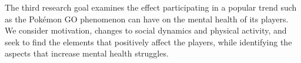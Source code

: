 The third research goal examines the effect participating in a popular trend such as the Pokémon GO phenomenon can have on the mental health of its players. We consider motivation, changes to social dynamics and physical activity, and seek to find the elements that positively affect the players, while identifying the aspects that increase mental health struggles.
